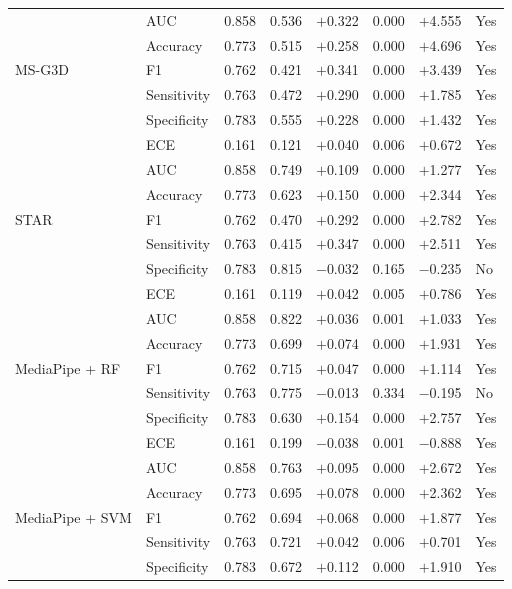 \documentclass[12pt,a4paper]{article}
\begin{document}
\begin{longtable}{@{}l l r r r r r l@{}}
\midrule
\multirow{5}{*}{MS-G3D}
 & AUC         & 0.858 & 0.536 & $+$0.322 & 0.000 & $+$4.555 & Yes \\
 & Accuracy    & 0.773 & 0.515 & $+$0.258 & 0.000 & $+$4.696 & Yes \\
 & F1          & 0.762 & 0.421 & $+$0.341 & 0.000 & $+$3.439 & Yes \\
 & Sensitivity & 0.763 & 0.472 & $+$0.290 & 0.000 & $+$1.785 & Yes \\
 & Specificity & 0.783 & 0.555 & $+$0.228 & 0.000 & $+$1.432 & Yes \\
 & ECE         & 0.161 & 0.121 & $+$0.040 & 0.006 & $+$0.672 & Yes \\
\midrule
\multirow{5}{*}{STAR}
 & AUC         & 0.858 & 0.749 & $+$0.109 & 0.000 & $+$1.277 & Yes \\
 & Accuracy    & 0.773 & 0.623 & $+$0.150 & 0.000 & $+$2.344 & Yes \\
 & F1          & 0.762 & 0.470 & $+$0.292 & 0.000 & $+$2.782 & Yes \\
 & Sensitivity & 0.763 & 0.415 & $+$0.347 & 0.000 & $+$2.511 & Yes \\
 & Specificity & 0.783 & 0.815 & $-$0.032 & 0.165 & $-$0.235 & No \\
 & ECE         & 0.161 & 0.119 & $+$0.042 & 0.005 & $+$0.786 & Yes \\
\midrule
\multirow{5}{*}{MediaPipe + RF}
 & AUC         & 0.858 & 0.822 & $+$0.036 & 0.001 & $+$1.033 & Yes \\
 & Accuracy    & 0.773 & 0.699 & $+$0.074 & 0.000 & $+$1.931 & Yes \\
 & F1          & 0.762 & 0.715 & $+$0.047 & 0.000 & $+$1.114 & Yes \\
 & Sensitivity & 0.763 & 0.775 & $-$0.013 & 0.334 & $-$0.195 & No \\
 & Specificity & 0.783 & 0.630 & $+$0.154 & 0.000 & $+$2.757 & Yes \\
 & ECE         & 0.161 & 0.199 & $-$0.038 & 0.001 & $-$0.888 & Yes \\
\midrule
\multirow{5}{*}{MediaPipe + SVM}
 & AUC         & 0.858 & 0.763 & $+$0.095 & 0.000 & $+$2.672 & Yes \\
 & Accuracy    & 0.773 & 0.695 & $+$0.078 & 0.000 & $+$2.362 & Yes \\
 & F1          & 0.762 & 0.694 & $+$0.068 & 0.000 & $+$1.877 & Yes \\
 & Sensitivity & 0.763 & 0.721 & $+$0.042 & 0.006 & $+$0.701 & Yes \\
 & Specificity & 0.783 & 0.672 & $+$0.112 & 0.000 & $+$1.910 & Yes \\

\end{longtable}
\end{document}
